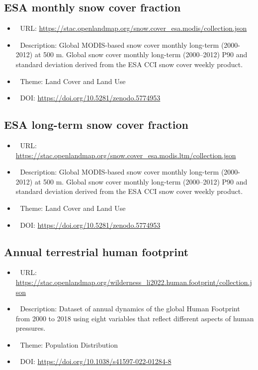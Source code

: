 \documentclass[
  graybox,natbib,nospthms]{svmono}
\providecommand{\tightlist}{%
  \setlength{\itemsep}{0pt}\setlength{\parskip}{0pt}}
\providecommand{\tightlist}{\setlength{\itemsep}{0pt}\setlength{\parskip}{0pt}}
\begin{document}
\hypertarget{esa-monthly-snow-cover-fraction}{%
\subsection{ESA monthly snow cover fraction}\label{esa-monthly-snow-cover-fraction}}

\begin{itemize}
\tightlist
\item
  🔗 URL: \url{https://stac.openlandmap.org/snow.cover_esa.modis/collection.json}
\item
  📰 Description: Global MODIS-based snow cover monthly long-term (2000-2012) at 500 m. Global snow cover monthly long-term (2000--2012) P90 and standard deviation derived from the ESA CCI snow cover weekly product.
\item
  📝 Theme: Land Cover and Land Use
\item
  📂 DOI: \url{https://doi.org/10.5281/zenodo.5774953}
\end{itemize}

\hypertarget{esa-long-term-snow-cover-fraction}{%
\subsection{ESA long-term snow cover fraction}\label{esa-long-term-snow-cover-fraction}}

\begin{itemize}
\tightlist
\item
  🔗 URL: \url{https://stac.openlandmap.org/snow.cover_esa.modis.ltm/collection.json}
\item
  📰 Description: Global MODIS-based snow cover monthly long-term (2000-2012) at 500 m. Global snow cover monthly long-term (2000--2012) P90 and standard deviation derived from the ESA CCI snow cover weekly product.
\item
  📝 Theme: Land Cover and Land Use
\item
  📂 DOI: \url{https://doi.org/10.5281/zenodo.5774953}
\end{itemize}

\hypertarget{annual-terrestrial-human-footprint}{%
\subsection{Annual terrestrial human footprint}\label{annual-terrestrial-human-footprint}}

\begin{itemize}
\tightlist
\item
  🔗 URL: \url{https://stac.openlandmap.org/wilderness_li2022.human.footprint/collection.json}
\item
  📰 Description: Dataset of annual dynamics of the global Human Footprint from 2000 to 2018 using eight variables that reflect different aspects of human pressures.
\item
  📝 Theme: Population Distribution
\item
  📂 DOI: \url{https://doi.org/10.1038/s41597-022-01284-8}
\end{itemize}
\end{document}

